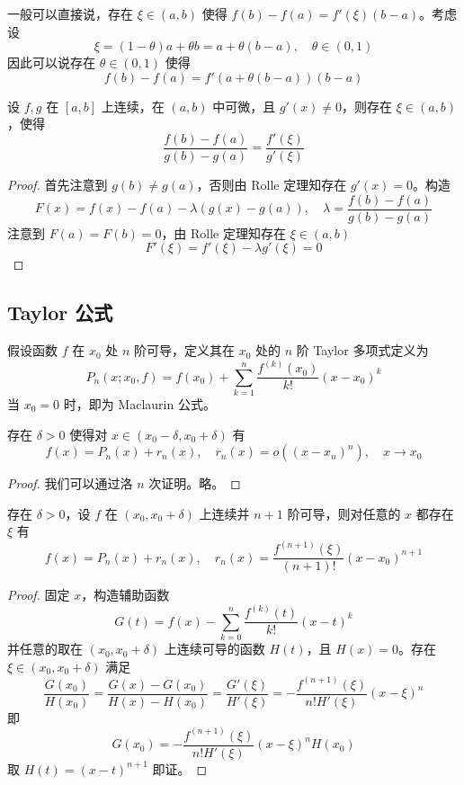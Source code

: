 一般可以直接说，存在 $\xi \in (a, b)$ 使得 $f(b) - f(a) = f'(\xi)(b-a)$。考虑设
\[ \xi = (1-\theta)a + \theta b = a + \theta(b-a), \quad \theta \in (0, 1) \]
因此可以说存在 $\theta \in (0, 1)$ 使得
\[ f(b) - f(a) = f'(a + \theta(b-a)) (b-a) \]

\begin{theorem}
	设 $f,g$ 在 $[a,b]$ 上连续，在 $(a,b)$ 中可微，且 $g'(x)\ne 0$，则存在 $\xi\in (a,b)$，使得
	\[ \frac{f(b)-f(a)}{g(b)-g(a)} = \frac{f'(\xi)}{g'(\xi)} \]
\end{theorem}

\begin{proof}
	首先注意到 $g(b) \neq g(a)$，否则由 Rolle 定理知存在 $g'(x) = 0$。构造
	\[ F(x) = f(x) - f(a) - \lambda (g(x) - g(a)) , \quad \lambda = \frac{f(b) - f(a)}{g(b) - g(a)} \]
	注意到 $F(a) = F(b) = 0$，由 Rolle 定理知存在 $\xi \in (a, b)$
	\[ F'(\xi) = f'(\xi) - \lambda g'(\xi) = 0 \]
\end{proof}

\subsection{Taylor 公式}

假设函数 $f$ 在 $x_0$ 处 $n$ 阶可导，定义其在 $x_0$ 处的 $n$ 阶 Taylor 多项式定义为
\[ P_n(x;x_0, f) = f(x_0) + \sum_{k=1}^{n} \frac{f^{(k)}(x_0)}{k!} (x-x_0)^k \]
当 $x_0 = 0$ 时，即为 Maclaurin 公式。

\begin{theorem}
	存在 $\delta > 0$ 使得对 $x \in (x_0 - \delta, x_0 + \delta)$ 有
	\[ f(x) = P_n(x) + r_n(x), \quad r_n(x) = o((x-x_n)^n), \quad x \to x_0 \]
\end{theorem}

\begin{proof}
	我们可以通过洛 $n$ 次证明。略。
\end{proof}

\begin{theorem}
	存在 $\delta > 0$，设 $f$ 在 $(x_0, x_0+\delta)$ 上连续并 $n + 1$ 阶可导，则对任意的 $x$ 都存在 $\xi$ 有
	\[ f(x) = P_n(x) + r_n(x), \quad r_n(x) = \frac{f^{(n+1)}(\xi)}{(n+1)!}(x-x_0)^{n+1} \]
\end{theorem}

\begin{proof}
	固定 $x$，构造辅助函数
	\[ G(t) = f(x) - \sum_{k=0}^n \frac{f^{(k)}(t)}{k!} (x-t)^k \]
	并任意的取在 $(x_0, x_0 + \delta)$ 上连续可导的函数 $H(t)$，且 $H(x) = 0$。存在 $\xi \in (x_0, x_0 + \delta)$ 满足
	\[ \frac{G(x_0)}{H(x_0)} = \frac{G(x) - G(x_0)}{H(x) - H(x_0)} = \frac{G'(\xi)}{H'(\xi)} = -\frac{f^{(n+1)}(\xi)}{n!H'(\xi)}(x-\xi)^n \]
	即
	\[ G(x_0) = -\frac{f^{(n+1)}(\xi)}{n! H'(\xi)}(x-\xi)^nH(x_0) \]
	取 $H(t) = (x-t)^{n+1}$ 即证。
\end{proof}

